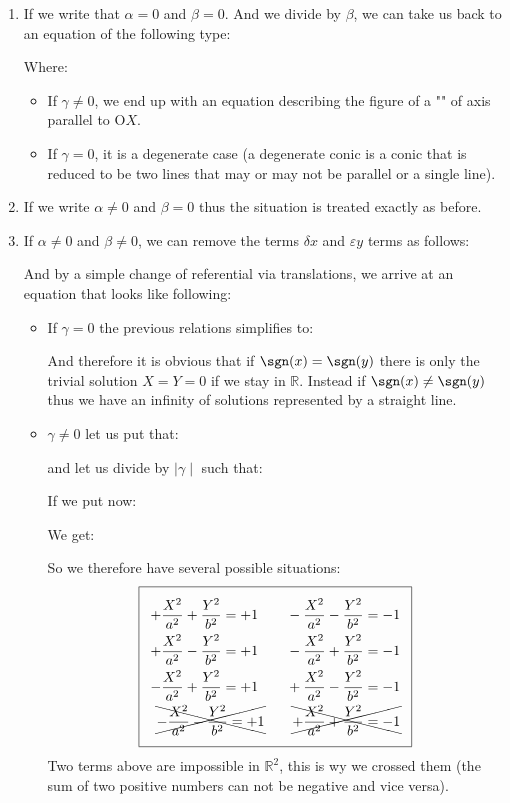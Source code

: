 	\begin{enumerate}
		\item If we write that $\alpha=0$ and  $\beta=0$. And we divide by $\beta$, we can take us back to an equation of the following type:
		
	Where:
		\begin{itemize}
			\item If $\gamma\neq 0$, we end up with an equation describing the figure of a "" of axis parallel to $\text{O}X$.
			\item If $\gamma = 0$, it is a degenerate case (a degenerate conic is a conic that is reduced to be two lines that may or may not be parallel or a single line).
		\end{itemize}
	\item If we write $\alpha \neq 0$ and $\beta = 0$ thus the situation is treated exactly as before.
	
	\item If $\alpha \neq 0$ and  $\beta \neq 0$, we can remove the terms $\delta x$ and $\varepsilon y$ terms as follows:
	
	
	And by a simple change of referential via translations, we arrive at an equation that looks like following:
		
		\begin{itemize}
			\item If $\gamma=0$ the previous relations simplifies to:
				
				And therefore it is obvious that if $\sgn(x)=\sgn(y)$ there is only the trivial solution $X=Y=0$ if we stay in $\mathbb{R}$. Instead if $\sgn(x) \neq \sgn(y)$ thus we have an infinity of solutions represented by a straight line.
			\item $\gamma \neq 0$ let us put that:
				
			and let us divide by $\mid \gamma \mid$ such that:
				
			If we put now:
			
			We get:
			
			So we therefore have several possible situations:
			\begin{equation}
			  \addtolength{\fboxsep}{5pt}
			   \boxed{
			   \begin{gathered}
				\begin{aligned}
				+\dfrac{X^2}{a^2}+\dfrac{Y^2}{b^2}=+1 \qquad -\dfrac{X^2}{a^2}-\dfrac{Y^2}{b^2}=-1\\
				+\dfrac{X^2}{a^2}-\dfrac{Y^2}{b^2}=+1 \qquad -\dfrac{X^2}{a^2}+\dfrac{Y^2}{b^2}=-1\\
				-\dfrac{X^2}{a^2}+\dfrac{Y^2}{b^2}=+1 \qquad +\dfrac{X^2}{a^2}-\dfrac{Y^2}{b^2}=-1\\
				\xcancel{-\dfrac{X^2}{a^2}-\dfrac{Y^2}{b^2}=+1} \qquad \xcancel{+\dfrac{X^2}{a^2}+\dfrac{Y^2}{b^2}=-1}\\
				\end{aligned}
			   \end{gathered}
			   }
			\end{equation}
			Two terms above are impossible in $\mathbb{R}^2$, this is wy we crossed them (the sum of two positive numbers can not be negative and vice versa).
			

\end{itemize}
\end{enumerate}
